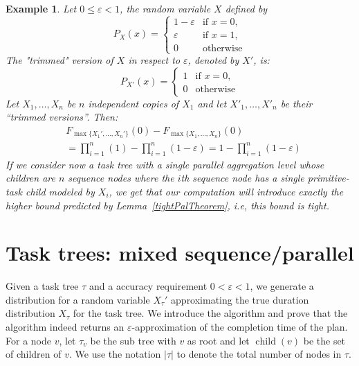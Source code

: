 \documentclass[review]{elsarticle}
\newtheorem{example}{Example}
\DeclareMathOperator{\ch}{\operatorname{child}}
\begin{document}
\begin{example}\label{expl:parallel}
Let $0 {\leq} \varepsilon {<}1$, 
the random variable $X$ defined by
$$
P_{X}(x) =\begin{cases}
1-\varepsilon  & \text{if } x=0, \\
\varepsilon     & \text{if } x=1, \\
0 & \text{otherwise}
\end{cases}
$$
The "trimmed" version of $X$ in respect to $\varepsilon$, denoted by $X'$, is:
$$
P_{X'}(x) =\begin{cases}
1  & \text{if } x=0, \\
0 & \text{otherwise}
\end{cases}
$$
Let $X_1, \dots, X_n$ be $n$ independent copies of $X_1$ and let $X'_1, \dots, X'_n$ be their ``trimmed versions''. Then:
{
\begin{align*} 
&F_{\max\{X_1',\dots, X_n'\}}( 0) - F_{\max\{X_1,\dots, X_n\}} (0)\\
&=\prod_{i=1}^n (1)-\prod_{i=1}^n (1-\varepsilon)= 1-\prod_{i=1}^n (1-\varepsilon)
\end{align*}}
If we consider now a task tree with a single parallel aggregation level whose children are $n$ 
sequence nodes where the $i$th sequence node has a single primitive-task child modeled by $X_i$, we get that our
computation will introduce exactly the higher bound predicted by Lemma~\ref{tightPalTheorem}, i.e, this bound is tight.
\end{example}

\section{Task trees: mixed sequence/parallel}\label{sec:trees}

Given a task tree $\tau$ and a accuracy requirement $0<\varepsilon<1$, we generate a distribution for a random variable $X_{\tau}'$ approximating the true duration distribution  $X_{\tau}$ for the task tree. 
We introduce the algorithm and prove that the algorithm indeed returns an $\varepsilon$-approximation of the completion time of the plan. 
For a node $v$, let $\tau_v $ be the sub tree with $v$ as root and let $\ch(v)$ be the set of children of $v$.
We use the notation $|\tau|$ to denote the total number of nodes in $\tau$.
\end{document}
